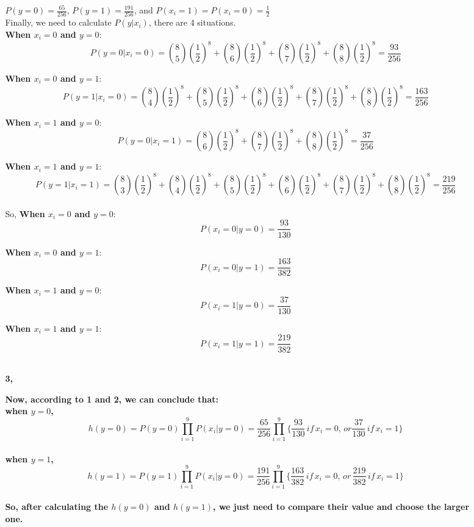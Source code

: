 \begin{enumerate}
\begin{enumerate}
\begin{enumerate}
$P(y=0) = \frac{65}{256}$, $P(y=1) = \frac{191}{256}$, and $P(x_i = 1) = P(x_i=0) = \frac{1}{2}$\\

Finally, we need to calculate $P(y|x_i)$, there are 4 situations.\\

{\bf When $x_i = 0$ and $y = 0$}:
$$P(y=0| x_i=0) = {8 \choose 5}(\frac{1}{2})^8 + {8 \choose 6}(\frac{1}{2})^8 + {8 \choose 7}(\frac{1}{2})^8 + {8 \choose 8}(\frac{1}{2})^8 = \frac{93}{256}$$

{\bf When $x_i = 0$ and $y = 1$}:
$$P(y=1| x_i=0) = {8 \choose 4}(\frac{1}{2})^8 + {8 \choose 5}(\frac{1}{2})^8 + {8 \choose 6}(\frac{1}{2})^8 + {8 \choose 7}(\frac{1}{2})^8 + {8 \choose 8}(\frac{1}{2})^8 = \frac{163}{256}$$

{\bf When $x_i = 1$ and $y = 0$}:
$$P(y=0| x_i=1) = {8 \choose 6}(\frac{1}{2})^8 + {8 \choose 7}(\frac{1}{2})^8 + {8 \choose 8}(\frac{1}{2})^8 = \frac{37}{256}$$

{\bf When $x_i = 1$ and $y = 1$}:
$$P(y=1| x_i=1) = {8 \choose 3}(\frac{1}{2})^8 + {8 \choose 4}(\frac{1}{2})^8 + {8 \choose 5}(\frac{1}{2})^8 + {8 \choose 6}(\frac{1}{2})^8 + {8 \choose 7}(\frac{1}{2})^8 + {8 \choose 8}(\frac{1}{2})^8 = \frac{219}{256}$$\\


So, 
{\bf When $x_i = 0$ and $y = 0$}:
$$P(x_i=0 | y=0) = \frac{93}{130}$$

{\bf When $x_i = 0$ and $y = 1$}:
$$P(x_i=0 | y=1) = \frac{163}{382}$$

{\bf When $x_i = 1$ and $y = 0$}:
$$P(x_i=1 | y=0) = \frac{37}{130}$$

{\bf When $x_i = 1$ and $y = 1$}:
$$P(x_i=1 | y=1) = \frac{219}{382}$$\\

\item[\bf 3, ]

{\bf Now, according to 1 and 2, we can conclude that:\\

when $y=0$,  
$$h(y=0) = P(y=0)\prod_{i=1}^9 P(x_i|y=0) = \frac{65}{256}\prod_{i=1}^9 \{\frac{93}{130} \, if \, x_i=0, \, or \frac{37}{130} \, if \, x_i=1 \}$$\\

when $y=1$,  
$$h(y=1) = P(y=1)\prod_{i=1}^9 P(x_i|y=0) = \frac{191}{256}\prod_{i=1}^9 \{\frac{163}{382} \, if \, x_i=0, \, or \, \frac{219}{382} \, if \, x_i=1 \}$$\\

So, after calculating the $h(y=0)$ and $h(y=1)$, we just need to compare their value and choose the larger one.\\
}
\end{enumerate}


\end{enumerate}
\end{enumerate}
